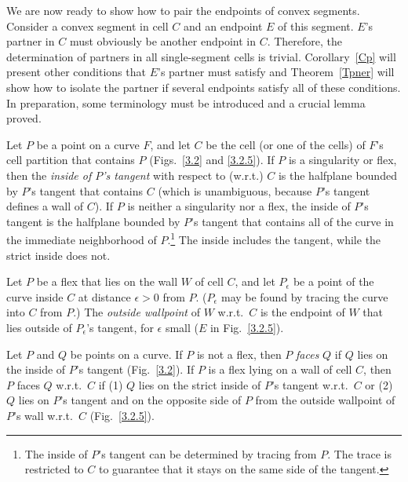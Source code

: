We are now ready to show how to pair the endpoints of convex segments.
Consider a convex segment in cell $C$ and an endpoint $E$ of this segment.
$E$'s partner in $C$ must obviously be another endpoint in $C$.
Therefore, the determination of partners in all single-segment cells is trivial.
Corollary~\ref{Cp} will present other conditions that $E$'s partner must satisfy
and Theorem~\ref{Tpner} will show how to isolate the partner if several endpoints
satisfy all of these conditions.
In preparation, some terminology must be introduced and a crucial lemma proved.
%
%
\begin{definition}
Let $P$ be a point on a curve $F$, and let $C$ be the cell (or one
of the cells) of $F$'s cell partition that contains $P$ 
(Figs.~\ref{3.2} and \ref{3.2.5}).
If $P$ is a singularity or flex, then the 
{\em inside of $P$'s tangent} with respect to (w.r.t.) $C$ is the 
halfplane bounded by $P$'s tangent that contains $C$ (which is unambiguous, because $P$'s 
tangent defines a wall of $C$).  
If $P$ is neither a singularity nor a flex, 
the inside of $P$'s tangent is the halfplane bounded by $P$'s tangent that 
contains all of the curve in the immediate neighborhood of $P$.\footnote{The 
	inside of $P$'s tangent
	can be determined by tracing from $P$.
	The trace is restricted to $C$
	to guarantee that it stays on the same side of the tangent.}
The inside includes the tangent, while the strict inside does not.

Let $P$ be a flex that lies on the wall $W$ of cell $C$, and 
let $P_{\epsilon}$ be a point of the curve inside $C$ at distance
$\epsilon > 0$ from $P$.
($P_{\epsilon}$ may be found by tracing the curve into $C$ from $P$.)
The {\em outside wallpoint} of $W$ w.r.t.\ $C$ is the endpoint of $W$ that 
lies outside of $P_{\epsilon}$'s tangent, for $\epsilon$ small ($E$ in Fig.~\ref{3.2.5}).

Let $P$ and $Q$ be points on a curve.
If $P$ is not a flex, then $P$ {\em faces} $Q$ if $Q$ lies on the inside of 
$P$'s tangent (Fig.~\ref{3.2}).
If $P$ is a flex lying on a wall of cell $C$, then
$P$ faces $Q$ w.r.t.\ $C$ if (1) $Q$ lies on the strict inside of $P$'s tangent 
w.r.t.\ $C$ or (2) $Q$ lies on $P$'s tangent and on the opposite side of $P$ from 
the outside wallpoint of $P$'s wall w.r.t.\ $C$ (Fig.~\ref{3.2.5}).
\end{definition}

